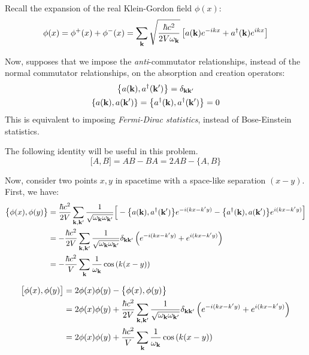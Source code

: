 \documentclass[letterpaper,12pt]{article}
\newenvironment{problem}{\subsection{}\begin{adjustwidth}{0.25in}{}\vspace{-\baselineskip}}{\end{adjustwidth}}
\begin{document}
\begin{problem}
Recall the expansion of the real Klein-Gordon field $\phi(x)$:
\begin{equation*}
	\phi(x) = \phi^+(x) + \phi^-(x) = \sum_{\vb{k}} \sqrt{\frac{\hbar c^2}{2V\omega_{\vb{k}}}} \left[a(\vb{k})e^{-ikx} + a^\dagger(\vb{k})e^{ikx}\right]
\end{equation*}

Now, supposes that we impose the \emph{anti}-commutator relationships, instead of the normal commutator relationships, on the absorption and creation operators:
\begin{gather*}
	\left\{a(\vb{k}), a^\dagger(\vb{k}')\right\} = \delta_{\vb{k}\vb{k}'}	\\
	\left\{a(\vb{k}), a(\vb{k}') \right\} = \left\{a^\dagger(\vb{k}), a^\dagger(\vb{k}') \right\} = 0
\end{gather*}
This is equivalent to imposing \emph{Fermi-Dirac statistics}, instead of Bose-Einstein statistics.

The following identity will be useful in this problem.
\begin{equation*}
	\big[A, B\big] = AB - BA = 2AB - \big\{A, B\}
\end{equation*}

Now, consider two points $x,y$ in spacetime with a space-like separation $(x-y)$. First, we have:
\begin{align*}
	\big\{\phi(x), \phi(y)\big\}
	&= \frac{\hbar c^2}{2V}\sum_{\vb{k},\vb{k}'} \frac{1}{\sqrt{\omega_{\vb{k}}\omega_{\vb{k}'}}}
	\Big[-\big\{a(\vb{k}), a^\dagger(\vb{k}')\big\}e^{-i(kx-k'y)} - \big\{a^\dagger(\vb{k}), a(\vb{k}')\big\}e^{i(kx-k'y)}\Big]	\\
	&= -\frac{\hbar c^2}{2V} \sum_{\vb{k},\vb{k}'} \frac{1}{\sqrt{\omega_{\vb{k}}\omega_{\vb{k}'}}} \delta_{\vb{k}\vb{k}'}\left(e^{-i(kx-k'y)} + e^{i(kx-k'y)}\right)	\\
	&= -\frac{\hbar c^2}{V} \sum_{\vb{k}} \frac{1}{\omega_{\vb{k}}} \cos\left(k(x-y)\right)
\end{align*}

\begin{align*}
	\big[\phi(x), \phi(y)\big]
	&= 2\phi(x)\phi(y) - \big\{\phi(x), \phi(y)\big\}	\\
	&= 2\phi(x)\phi(y) + \frac{\hbar c^2}{2V} \sum_{\vb{k},\vb{k}'} \frac{1}{\sqrt{\omega_{\vb{k}}\omega_{\vb{k}'}}} \delta_{\vb{k}\vb{k}'}\left(e^{-i(kx-k'y)} + e^{i(kx-k'y)}\right)		\\
	&= 2\phi(x)\phi(y) + \frac{\hbar c^2}{V} \sum_{\vb{k}} \frac{1}{\omega_{\vb{k}}} \cos\left(k(x-y)\right)
\end{align*}
\end{problem}
\end{document}
